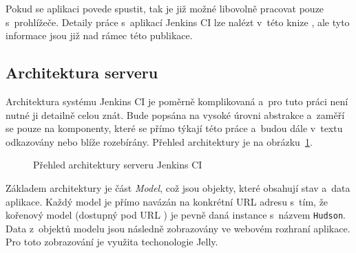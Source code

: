             Pokud se aplikaci povede spustit, tak je již možné libovolně pracovat pouze s~prohlížeče. Detaily práce s~aplikací Jenkins CI
            lze nalézt v~této knize \cite{jenkinsBook}, ale tyto informace jsou již nad rámec této publikace.
            
        \subsection{Architektura serveru}   \label{secJenkinsArchitektura}
            Architektura systému Jenkins CI je poměrně komplikovaná a~pro tuto práci není nutné ji detailně celou znát.
            Bude popsána na vysoké úrovni abstrakce a~zaměří se pouze na komponenty, které se přímo týkají této práce
            a~budou dále v~textu odkazovány nebo blíže rozebírány. Přehled architektury je na obrázku~\ref{imgJenkinsArchitecture}.
       
            \begin{figure}[ht]
                \begin{center}
                    \caption{Přehled architektury serveru Jenkins CI \cite{architectureOverview}}
                    \label{imgJenkinsArchitecture}
                \end{center}
            \end{figure}     

            Základem architektury je část \emph{Model}, což jsou objekty, které obsahují stav
            a~data aplikace. Každý model je přímo navázán na konkrétní URL adresu s~tím, že kořenový
            model (dostupný pod URL \uv{/}) je pevně daná instance s~názvem \texttt{Hudson}.
            Data z~objektů modelu jsou následně zobrazovány ve webovém rozhraní aplikace.
            Pro toto zobrazování je využita techonologie Jelly.

